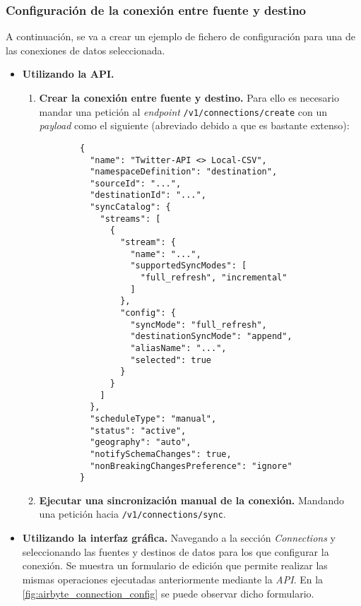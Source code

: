 \subsubsection{Configuración de la conexión entre fuente y destino}

A continuación, se va a crear un ejemplo de fichero de configuración para una de las conexiones de datos seleccionada.

\begin{itemize}
    
    \item \textbf{Utilizando la API.}
    
    \begin{enumerate}
        
        \item \textbf{Crear la conexión entre fuente y destino.} Para ello es necesario mandar una petición al \textit{endpoint} \verb|/v1/connections/create| con un \textit{payload} como el siguiente (abreviado debido a que es bastante extenso):

        \begin{verbatim}
        {
          "name": "Twitter-API <> Local-CSV",
          "namespaceDefinition": "destination",
          "sourceId": "...",
          "destinationId": "...",
          "syncCatalog": {
            "streams": [
              {
                "stream": {
                  "name": "...",
                  "supportedSyncModes": [
                    "full_refresh", "incremental"
                  ]
                },
                "config": {
                  "syncMode": "full_refresh",
                  "destinationSyncMode": "append",
                  "aliasName": "...",
                  "selected": true
                }
              }
            ]
          },
          "scheduleType": "manual",
          "status": "active",
          "geography": "auto",
          "notifySchemaChanges": true,
          "nonBreakingChangesPreference": "ignore"
        }
        \end{verbatim}
        
        \item \textbf{Ejecutar una sincronización manual de la conexión.} Mandando una petición hacia \verb|/v1/connections/sync|.
    
    \end{enumerate}
    
    \item \textbf{Utilizando la interfaz gráfica.} Navegando a la sección \textit{Connections} y seleccionando las fuentes y destinos de datos para los que configurar la conexión. Se muestra un formulario de edición que permite realizar las mismas operaciones ejecutadas anteriormente mediante la \textit{API}. En la \autoref{fig:airbyte_connection_config} se puede observar dicho formulario.

    
\end{itemize}
